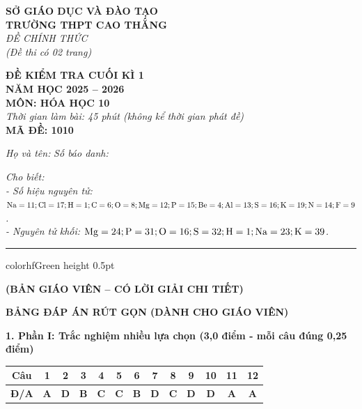 \documentclass[11pt,a4paper]{article}
\begin{document}
\begin{minipage}[t]{0.48\textwidth}
\textbf{SỞ GIÁO DỤC VÀ ĐÀO TẠO}\\
\textbf{TRƯỜNG THPT CAO THẮNG}\\
\textit{ĐỀ CHÍNH THỨC}\\
\textit{(Đề thi có 02 trang)}
\end{minipage}
\hfill
\begin{minipage}[t]{0.48\textwidth}
\raggedleft
\textbf{\color{hfRed}ĐỀ KIỂM TRA CUỐI KÌ 1}\\
\textbf{NĂM HỌC 2025 -- 2026}\\
\textbf{MÔN: HÓA HỌC 10}\\
\textit{Thời gian làm bài: 45 phút (không kể thời gian phát đề)}\\
\textbf{MÃ ĐỀ: 1010}
\end{minipage}

\vspace{4pt}
\noindent
\textit{Họ và tên:} \dotfill \textit{Số báo danh:} \dotfill

\vspace{3pt}
\noindent
\textit{\footnotesize Cho biết:}\\
\textit{\footnotesize - Số hiệu nguyên tử: $\ce{Na}=11; \ce{Cl}=17; \ce{H}=1; \ce{C}=6; \ce{O}=8; \ce{Mg}=12; \ce{P}=15; \ce{Be}=4; \ce{Al}=13; \ce{S}=16; \ce{K}=19; \ce{N}=14; \ce{F}=9$.}\\
\textit{\footnotesize - Nguyên tử khối: $\ce{Mg}=24; \ce{P}=31; \ce{O}=16; \ce{S}=32; \ce{H}=1; \ce{Na}=23; \ce{K}=39$.}

\vspace{3pt}
\hrule color{hfGreen} height 0.5pt

\vspace{4pt}
\begin{center}
\textbf{\color{hfRed}\large (BẢN GIÁO VIÊN -- CÓ LỜI GIẢI CHI TIẾT)}
\end{center}

\vspace{2pt}
\begin{center}
{\color{hfRed}\textbf{\large BẢNG ĐÁP ÁN RÚT GỌN (DÀNH CHO GIÁO VIÊN)}}
\end{center}

\vspace{2pt}
\noindent
\textbf{\color{mainGreen}1. Phần I: Trắc nghiệm nhiều lựa chọn (3,0 điểm - mỗi câu đúng 0,25 điểm)}
\begin{center}
\renewcommand{\arraystretch}{1.2}
\begin{tabular}{|c|c|c|c|c|c|c|c|c|c|c|c|c|}
\hline
\rowcolor{tableGreen}
\textbf{Câu} & \textbf{1} & \textbf{2} & \textbf{3} & \textbf{4} & \textbf{5} & \textbf{6} & \textbf{7} & \textbf{8} & \textbf{9} & \textbf{10} & \textbf{11} & \textbf{12} \\
\hline
\textbf{Đ/A} & \textbf{\color{hfRed}A} & \textbf{\color{hfRed}D} & \textbf{\color{hfRed}B} & \textbf{\color{hfRed}C} & \textbf{\color{hfRed}C} & \textbf{\color{hfRed}B} & \textbf{\color{hfRed}D} & \textbf{\color{hfRed}C} & \textbf{\color{hfRed}D} & \textbf{\color{hfRed}D} & \textbf{\color{hfRed}A} & \textbf{\color{hfRed}A} \\
\hline
\end{tabular}
\end{center}
\end{document}
